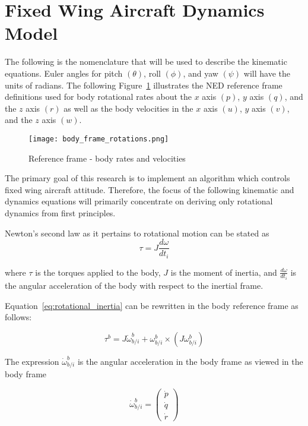 \label{appendix:dynamics_model}
\section{Fixed Wing Aircraft Dynamics Model}

The following is the nomenclature that will be used to describe the kinematic equations.  Euler angles for pitch $(\theta)$, roll $(\phi)$, and yaw $(\psi)$ will have the units of radians.  The following Figure~\ref{fig:reference_frame} illustrates the \ac{NED} reference frame definitions used for body rotational rates about the $x$ axis $(p)$, $y$ axis $(q)$, and the $z$ axis $(r)$ as well as the body velocities in the $x$ axis $(u)$, $y$ axis $(v)$, and the $z$ axis $(w)$.

\begin{figure}[h!]
 \centering
  \texttt{[image: body\_frame\_rotations.png]}
  \caption{Reference frame - body rates and velocities}
  \label{fig:reference_frame}
\end{figure}

The primary goal of this research is to implement an algorithm which controls fixed wing aircraft attitude.  Therefore, the focus of the following kinematic and dynamics equations will primarily concentrate on deriving only rotational dynamics from first principles.  

Newton's second law as it pertains to rotational motion can be stated as
\begin{equation}\label{eq:rotational_inertia}
\tau=J\frac{d\omega}{dt_i}
\end{equation}

where $\tau$ is the torques applied to the body, $J$ is the moment of inertia, and $ \frac{d\omega}{dt_i}$ is the angular acceleration of the body with respect to the inertial frame.

Equation~\ref{eq:rotational_inertia} can be rewritten in the body reference frame as follows:

\begin{equation}
\tau^b=J\dot{\omega}_{b/i}^b+\omega_{b/i}^b\times\left(J\omega_{b/i}^b\right)
\end{equation}

The expression $\dot{\omega}_{b/i}^b$ is the angular acceleration in the body frame as viewed in the body frame

\begin{equation}
\dot{\omega}_{b/i}^b=
\begin{pmatrix}
\dot{p}\\
\dot{q}\\
\dot{r}
\end{pmatrix}
\end{equation}

